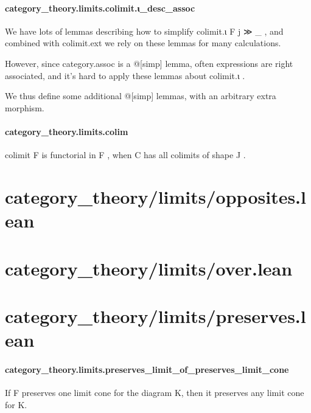 \documentclass{article}
\begin{document}
\paragraph{category\_theory.limits.colimit.ι\_desc\_assoc}
\par
We have lots of lemmas describing how to simplify 
\colorbox[RGB]{253,246,227}{{{{\color[RGB]{101, 123, 131} colimit.ι F j ≫ \_ }}}},
and combined with 
\colorbox[RGB]{253,246,227}{{{{\color[RGB]{101, 123, 131} colimit.ext }}}} we rely on these lemmas for many calculations.
\par
However, since 
\colorbox[RGB]{253,246,227}{{{{\color[RGB]{101, 123, 131} category.assoc }}}} is a 
\colorbox[RGB]{253,246,227}{{{{\color[RGB]{88, 110, 117} @{[}simp{]} }}}} lemma, often expressions are
right associated, and it's hard to apply these lemmas about 
\colorbox[RGB]{253,246,227}{{{{\color[RGB]{101, 123, 131} colimit.ι }}}}.
\par
We thus define some additional 
\colorbox[RGB]{253,246,227}{{{{\color[RGB]{88, 110, 117} @{[}simp{]} }}}} lemmas, with an arbitrary extra morphism.
\paragraph{category\_theory.limits.colim}
\par
\colorbox[RGB]{253,246,227}{{{{\color[RGB]{101, 123, 131} colimit F }}}} is functorial in 
\colorbox[RGB]{253,246,227}{{{{\color[RGB]{101, 123, 131} F }}}}, when 
\colorbox[RGB]{253,246,227}{{{{\color[RGB]{101, 123, 131} C }}}} has all colimits of shape 
\colorbox[RGB]{253,246,227}{{{{\color[RGB]{101, 123, 131} J }}}}.
\section{category\_theory/limits/opposites.lean}\section{category\_theory/limits/over.lean}\section{category\_theory/limits/preserves.lean}\paragraph{category\_theory.limits.preserves\_limit\_of\_preserves\_limit\_cone}
\par
If F preserves one limit cone for the diagram K,
then it preserves any limit cone for K.
\end{document}
